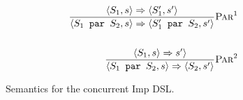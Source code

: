\begin{figure}[!htbp]
\begin{align*}
\frac{\langle S_1 , s \rangle \Rightarrow \langle S_1' , s' \rangle}
	 {\langle S_1 \texttt{ par } S_2, s \rangle \Rightarrow \langle S_1' \texttt{ par } S_2, s' \rangle}
	 \textsc{Par}^1 
\\
\\
\frac{\langle S_1 , s \rangle \Rightarrow s' \rangle}
     {\langle S_1 \texttt{ par } S_2, s \rangle \Rightarrow \langle S_2, s' \rangle}  
	 \textsc{Par}^2
\end{align*}
\caption{Semantics for the concurrent Imp DSL.
}
\label{fig:par-rules}
\end{figure}
